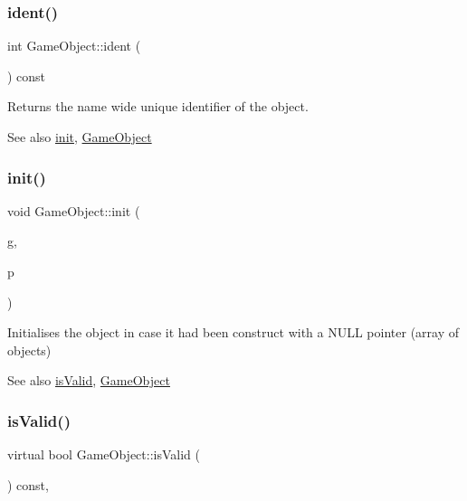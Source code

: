 \subsubsection{\texorpdfstring{ident()}{ident()}}
{\footnotesize\ttfamily int Game\+Object\+::ident (\begin{DoxyParamCaption}{ }\end{DoxyParamCaption}) const\hspace{0.3cm}{\ttfamily [inline]}}

Returns the name wide unique identifier of the object.

\begin{DoxySeeAlso}{See also}
\hyperlink{class_game_object_a97be7b59b2e76e7d60de2146b894eed9}{init}, \hyperlink{class_game_object_ab00c537faf6eb4439c60003141a763b9}{Game\+Object} 
\end{DoxySeeAlso}
\hypertarget{class_game_object_a97be7b59b2e76e7d60de2146b894eed9}{}\label{class_game_object_a97be7b59b2e76e7d60de2146b894eed9} 
\subsubsection{\texorpdfstring{init()}{init()}}
{\footnotesize\ttfamily void Game\+Object\+::init (\begin{DoxyParamCaption}\item[{\hyperlink{class_game}{Game} $\ast$}]{g,  }\item[{\hyperlink{class_game_object}{Game\+Object} $\ast$}]{p }\end{DoxyParamCaption})}

Initialises the object in case it had been construct with a N\+U\+LL pointer (array of objects)

\begin{DoxySeeAlso}{See also}
\hyperlink{class_game_object_a47fec909421c91c9a9cb5ef415d7cd23}{is\+Valid}, \hyperlink{class_game_object_ab00c537faf6eb4439c60003141a763b9}{Game\+Object} 
\end{DoxySeeAlso}
\hypertarget{class_game_object_a47fec909421c91c9a9cb5ef415d7cd23}{}\label{class_game_object_a47fec909421c91c9a9cb5ef415d7cd23} 
\subsubsection{\texorpdfstring{is\+Valid()}{isValid()}}
{\footnotesize\ttfamily virtual bool Game\+Object\+::is\+Valid (\begin{DoxyParamCaption}{ }\end{DoxyParamCaption}) const\hspace{0.3cm}{\ttfamily [inline]}, {\ttfamily [virtual]}}

